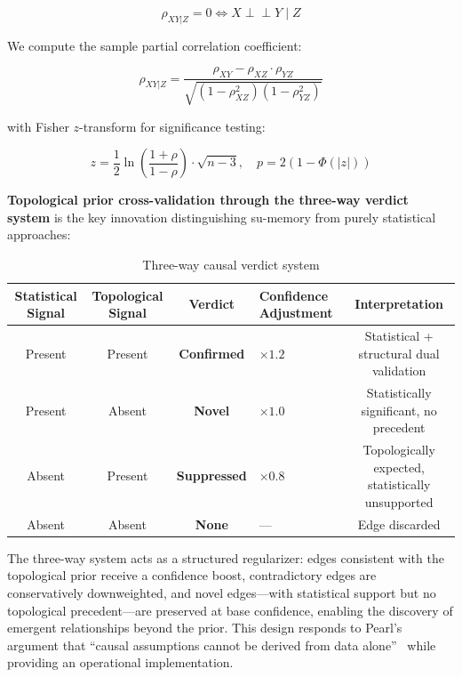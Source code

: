 \documentclass[11pt,a4paper]{article}
\begin{document}
\begin{equation}
\rho_{XY|Z} = 0 \iff X \perp\!\!\!\perp Y \mid Z
\label{eq:cond_indep}
\end{equation}

We compute the sample partial correlation coefficient:

\begin{equation}
\rho_{XY|Z} = \frac{\rho_{XY} - \rho_{XZ} \cdot \rho_{YZ}}{\sqrt{(1 - \rho_{XZ}^2)(1 - \rho_{YZ}^2)}}
\label{eq:partial_corr}
\end{equation}

with Fisher \(z\)-transform for significance testing:

\begin{equation}
z = \frac{1}{2} \ln\left(\frac{1 + \rho}{1 - \rho}\right) \cdot \sqrt{n - 3}, \quad p = 2(1 - \Phi(|z|))
\label{eq:fisher_z}
\end{equation}

\textbf{Topological prior cross-validation through the three-way verdict system} is the key innovation distinguishing su-memory from purely statistical approaches:

\begin{table}[H]
\centering
\caption{Three-way causal verdict system}
\label{tab:verdict}
\begin{tabular}{ccclc}
\toprule
\textbf{Statistical Signal} & \textbf{Topological Signal} & \textbf{Verdict} & \textbf{Confidence Adjustment} & \textbf{Interpretation} \\
\midrule
Present & Present & \textbf{Confirmed} & \(\times 1.2\) & Statistical + structural dual validation \\
Present & Absent  & \textbf{Novel}     & \(\times 1.0\) & Statistically significant, no precedent \\
Absent  & Present & \textbf{Suppressed} & \(\times 0.8\) & Topologically expected, statistically unsupported \\
Absent  & Absent  & \textbf{None}      & ---           & Edge discarded \\
\bottomrule
\end{tabular}
\end{table}

The three-way system acts as a structured regularizer: edges consistent with the topological prior receive a confidence boost, contradictory edges are conservatively downweighted, and novel edges---with statistical support but no topological precedent---are preserved at base confidence, enabling the discovery of emergent relationships beyond the prior. This design responds to Pearl's argument that ``causal assumptions cannot be derived from data alone''~\cite{pearl2009} while providing an operational implementation.
\end{document}
